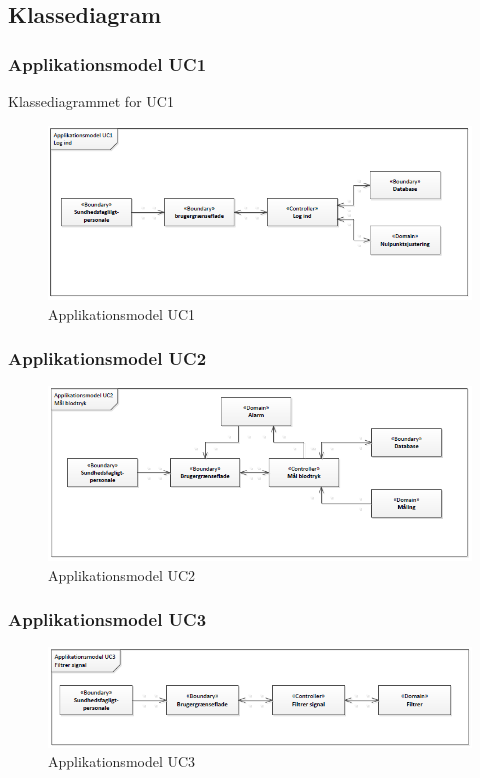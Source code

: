 \subsection{Klassediagram}
\subsubsection{Applikationsmodel UC1}
Klassediagrammet for UC1 
\begin{figure}[H]
\centering
\includegraphics[scale=0.70]{app1.PNG}
\caption{Applikationsmodel UC1}
\end{figure}

\subsubsection{Applikationsmodel UC2}
\begin{figure}[H]
\centering
\includegraphics[scale=0.70]{app2.PNG}
\caption{Applikationsmodel UC2}
\end{figure}

\subsubsection{Applikationsmodel UC3}
\begin{figure}[H]
\centering
\includegraphics[scale=0.70]{app3.PNG}
\caption{Applikationsmodel UC3}
\end{figure}

